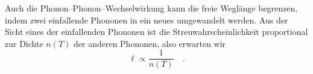 


Auch die Phonon--Phonon--Wechselwirkung kann die freie Weglänge begrenzen, indem zwei einfallende Phononen in ein neues umgewandelt werden. Aus der Sicht eines der einfallenden Phononen ist die Streuwahrscheinlichkeit proportional zur Dichte $n(T)$ der anderen Phononen, also erwarten wir
\begin{equation}
    \ell \propto \frac{1}{n(T)} \quad .
\end{equation}




